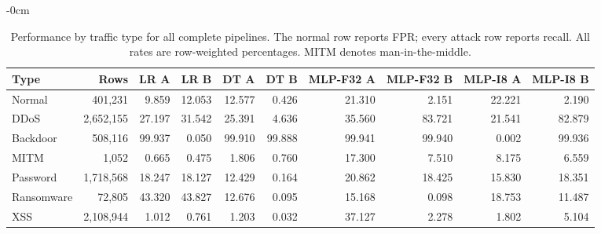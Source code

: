 \begin{table}[H]\begin{adjustwidth}{-\extralength}{0cm}
\caption{Performance by traffic type for all complete pipelines. The normal row reports FPR; every attack row reports recall. All rates are row-weighted percentages. MITM denotes man-in-the-middle.}\label{tab:types-complete}
\centering\scriptsize\setlength{\tabcolsep}{3pt}
\begin{tabular}{lrrrrrrrrr}
\toprule
Type & Rows & LR A & LR B & DT A & DT B & MLP-F32 A & MLP-F32 B & MLP-I8 A & MLP-I8 B \\
\midrule
Normal & 401,231 & 9.859 & 12.053 & 12.577 & 0.426 & 21.310 & 2.151 & 22.221 & 2.190 \\
DDoS & 2,652,155 & 27.197 & 31.542 & 25.391 & 4.636 & 35.560 & 83.721 & 21.541 & 82.879 \\
Backdoor & 508,116 & 99.937 & 0.050 & 99.910 & 99.888 & 99.941 & 99.940 & 0.002 & 99.936 \\
MITM & 1,052 & 0.665 & 0.475 & 1.806 & 0.760 & 17.300 & 7.510 & 8.175 & 6.559 \\
Password & 1,718,568 & 18.247 & 18.127 & 12.429 & 0.164 & 20.862 & 18.425 & 15.830 & 18.351 \\
Ransomware & 72,805 & 43.320 & 43.827 & 12.676 & 0.095 & 15.168 & 0.098 & 18.753 & 11.487 \\
XSS & 2,108,944 & 1.012 & 0.761 & 1.203 & 0.032 & 37.127 & 2.278 & 1.802 & 5.104 \\
\bottomrule
\end{tabular}
\end{adjustwidth}\end{table}
